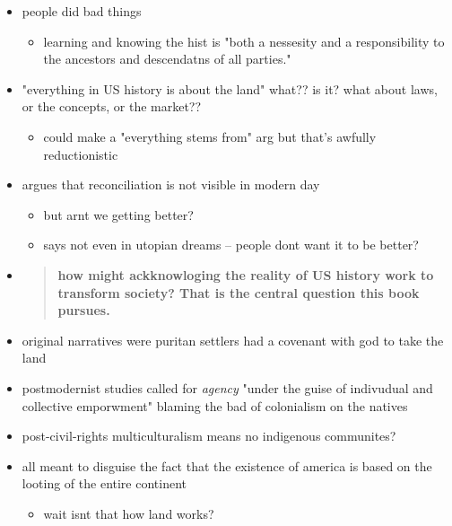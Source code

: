 \documentclass[letterpaper]{article}
\begin{document}
\begin{itemize}
\item people did bad things

\begin{itemize}
\item learning and knowing the hist is "both a nessesity and a
responsibility to the ancestors and descendatns of all parties."
\end{itemize}

\item "everything in US history is about the land" what?? is it? what about
laws, or the concepts, or the market??

\begin{itemize}
\item could make a "everything stems from" arg but that's awfully
reductionistic
\end{itemize}

\item argues that reconciliation is not visible in modern day

\begin{itemize}
\item but arnt we getting better?
\item says not even in utopian dreams -- people dont want it to be better?
\end{itemize}

\item \begin{quote}
\textbf{how might ackknowloging the reality of US history work to transform
society? That is the central question this book pursues.}
\end{quote}

\item original narratives were puritan settlers had a covenant with god to
take the land

\item postmodernist studies called for \emph{agency} "under the guise of
indivudual and collective emporwment" blaming the bad of colonialism
on the natives

\item post-civil-rights multiculturalism means no indigenous communites?

\item all meant to disguise the fact that the existence of america is based
on the looting of the entire continent

\begin{itemize}
\item wait isnt that how land works?
\end{itemize}
\end{itemize}
\end{document}
